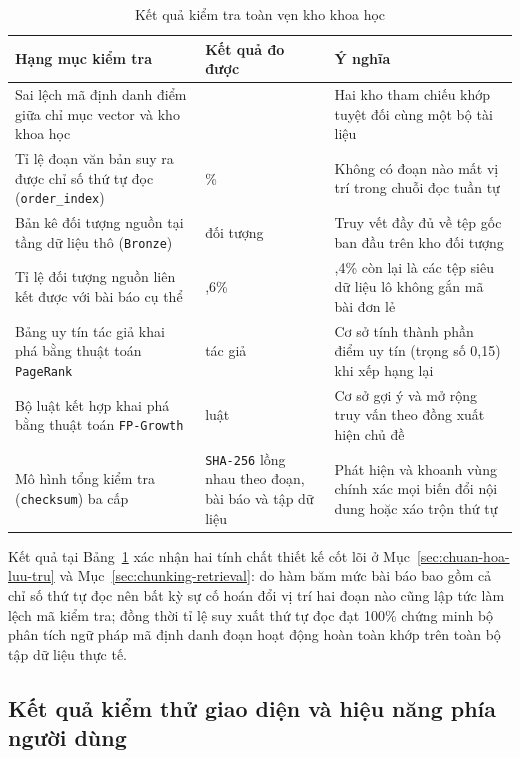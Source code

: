 \begin{table}[htbp]
\centering
\caption{Kết quả kiểm tra toàn vẹn kho khoa học}
\label{tab:toan-ven-kho-khoa-hoc}
\small
\begin{tabularx}{\textwidth}{
  >{\raggedright\arraybackslash}p{4.8cm}
  >{\raggedright\arraybackslash}p{3.4cm}
  >{\raggedright\arraybackslash}X
}
\toprule
\textbf{Hạng mục kiểm tra} & \textbf{Kết quả đo được} & \textbf{Ý nghĩa} \\
\midrule
Sai lệch mã định danh điểm giữa chỉ mục vector và kho khoa học & 0 & Hai kho tham chiếu khớp tuyệt đối cùng một bộ tài liệu \\
\midrule
Tỉ lệ đoạn văn bản suy ra được chỉ số thứ tự đọc (\texttt{order\_index}) & 100\% & Không có đoạn nào mất vị trí trong chuỗi đọc tuần tự \\
\midrule
Bản kê đối tượng nguồn tại tầng dữ liệu thô (\texttt{Bronze}) & 136.823 đối tượng & Truy vết đầy đủ về tệp gốc ban đầu trên kho đối tượng \\
\midrule
Tỉ lệ đối tượng nguồn liên kết được với bài báo cụ thể & 95,6\% & 4,4\% còn lại là các tệp siêu dữ liệu lô không gắn mã bài đơn lẻ \\
\midrule
Bảng uy tín tác giả khai phá bằng thuật toán \texttt{PageRank} & 120 tác giả & Cơ sở tính thành phần điểm uy tín (trọng số 0,15) khi xếp hạng lại \\
\midrule
Bộ luật kết hợp khai phá bằng thuật toán \texttt{FP-Growth} & 40 luật & Cơ sở gợi ý và mở rộng truy vấn theo đồng xuất hiện chủ đề \\
\midrule
Mô hình tổng kiểm tra (\texttt{checksum}) ba cấp & \texttt{SHA-256} lồng nhau theo đoạn, bài báo và tập dữ liệu & Phát hiện và khoanh vùng chính xác mọi biến đổi nội dung hoặc xáo trộn thứ tự \\
\bottomrule
\end{tabularx}
\end{table}

Kết quả tại Bảng~\ref{tab:toan-ven-kho-khoa-hoc} xác nhận hai tính chất thiết kế cốt lõi ở Mục~\ref{sec:chuan-hoa-luu-tru} và Mục~\ref{sec:chunking-retrieval}: do hàm băm mức bài báo bao gồm cả chỉ số thứ tự đọc nên bất kỳ sự cố hoán đổi vị trí hai đoạn nào cũng lập tức làm lệch mã kiểm tra; đồng thời tỉ lệ suy xuất thứ tự đọc đạt 100\% chứng minh bộ phân tích ngữ pháp mã định danh đoạn hoạt động hoàn toàn khớp trên toàn bộ tập dữ liệu thực tế.

\subsection{Kết quả kiểm thử giao diện và hiệu năng phía người dùng}
\label{subsec:ket-qua-kiem-thu-giao-dien}

